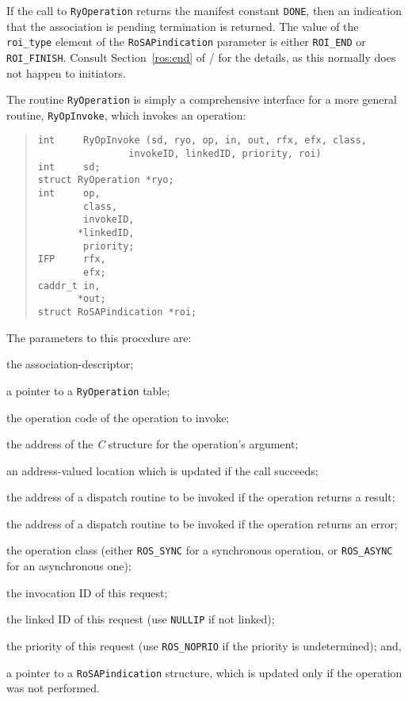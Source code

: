 If the call to \verb"RyOperation" returns the manifest constant \verb"DONE",
then an indication that the association is pending termination is returned.
The value of the \verb"roi_type" element of the \verb"RoSAPindication"
parameter is either \verb"ROI_END" or \verb"ROI_FINISH".
Consult Section~\ref{ros:end} of \volone/ for the details,
as this normally does not happen to initiators.

The routine \verb"RyOperation" is simply a comprehensive interface for a more
general routine, \verb"RyOpInvoke", which invokes an operation:
\begin{quote}\small\begin{verbatim}
int     RyOpInvoke (sd, ryo, op, in, out, rfx, efx, class,
                invokeID, linkedID, priority, roi)
int     sd;
struct RyOperation *ryo;
int     op,
        class,
        invokeID,
       *linkedID,
        priority;
IFP     rfx,
        efx;
caddr_t in,
       *out;
struct RoSAPindication *roi;
\end{verbatim}\end{quote}
The parameters to this procedure are:
\begin{describe}
\item[\verb"sd":] the association-descriptor;

\item[\verb"ryo":] a pointer to a \verb"RyOperation" table;

\item[\verb"op":] the operation code of the operation to invoke;

\item[\verb"in":] the address of the {\em C\/} structure for the operation's
argument;

\item[\verb"out":] an address-valued location which is updated if the call
succeeds;

\item[\verb"rfx":] the address of a dispatch routine to be invoked if
the operation returns a result;

\item[\verb"efx":] the address of a dispatch routine to be invoked if
the operation returns an error;

\item[\verb"class":] the operation class
(either \verb"ROS_SYNC" for a synchronous operation,
or \verb"ROS_ASYNC" for an asynchronous one);

\item[\verb"invokeID":] the invocation ID of this request;

\item[\verb"linkedID":] the linked ID of this request
(use \verb"NULLIP" if not linked);

\item[\verb"priority":] the priority of this request
(use \verb"ROS_NOPRIO" if the priority is undetermined);
and,

\item[\verb"roi":] a pointer to a \verb"RoSAPindication" structure,
which is updated only if the operation was not performed.
\end{describe}
